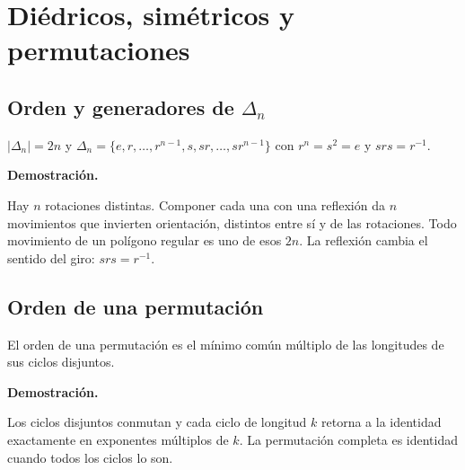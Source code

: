 \documentclass[11pt,a4paper]{article}
\begin{document}
\section{Diédricos, simétricos y permutaciones}

\subsection{Orden y generadores de $\Delta_n$}
\begin{resultado}
$|\Delta_n|=2n$ y $\Delta_n=\{e,r,\ldots,r^{n-1},s,sr,\ldots,sr^{n-1}\}$ con $r^n=s^2=e$ y $srs=r^{-1}$.
\end{resultado}
\textbf{Demostración.}
\begin{demostracion}
Hay $n$ rotaciones distintas. Componer cada una con una reflexión da $n$ movimientos que invierten orientación, distintos entre sí y de las rotaciones. Todo movimiento de un polígono regular es uno de esos $2n$. La reflexión cambia el sentido del giro: $srs=r^{-1}$.
\end{demostracion}


\subsection{Orden de una permutación}
\begin{resultado}
El orden de una permutación es el mínimo común múltiplo de las longitudes de sus ciclos disjuntos.
\end{resultado}
\textbf{Demostración.}
\begin{demostracion}
Los ciclos disjuntos conmutan y cada ciclo de longitud $k$ retorna a la identidad exactamente en exponentes múltiplos de $k$. La permutación completa es identidad cuando todos los ciclos lo son.
\end{demostracion}
\end{document}
